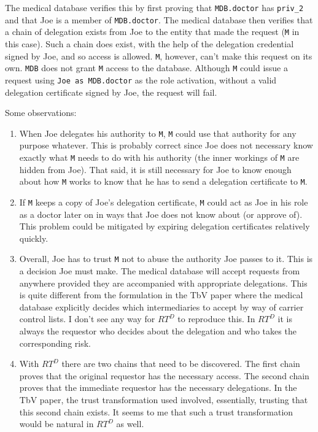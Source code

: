 \documentclass{article}
\begin{document}
The medical database verifies this by first proving that \texttt{MDB.doctor} has
\texttt{priv\_2} and that Joe is a member of \texttt{MDB.doctor}. The medical database then
verifies that a chain of delegation exists from Joe to the entity that made the request
(\texttt{M} in this case). Such a chain does exist, with the help of the delegation credential
signed by Joe, and so access is allowed. \texttt{M}, however, can't make this request on its
own. \texttt{MDB} does not grant \texttt{M} access to the database. Although \texttt{M} could
issue a request using \texttt{Joe as MDB.doctor} as the role activation, without a valid
delegation certificate signed by Joe, the request will fail.

Some observations:

\begin{enumerate}

\item When Joe delegates his authority to \texttt{M}, \texttt{M} could use that authority for
  any purpose whatever. This is probably correct since Joe does not necessary know exactly what
  \texttt{M} needs to do with his authority (the inner workings of \texttt{M} are hidden from
  Joe). That said, it is still necessary for Joe to know enough about how \texttt{M} works to
  know that he has to send a delegation certificate to \texttt{M}.

\item If \texttt{M} keeps a copy of Joe's delegation certificate, \texttt{M} could act as Joe in
  his role as a doctor later on in ways that Joe does not know about (or approve of). This
  problem could be mitigated by expiring delegation certificates relatively quickly.

\item Overall, Joe has to trust \texttt{M} not to abuse the authority Joe passes to it. This is
  a decision Joe must make. The medical database will accept requests from anywhere provided
  they are accompanied with appropriate delegations. This is quite different from the
  formulation in the TbV paper where the medical database explicitly decides which
  intermediaries to accept by way of carrier control lists. I don't see any way for $RT^D$ to
  reproduce this. In $RT^D$ it is always the requestor who decides about the delegation and who
  takes the corresponding risk.

\item With $RT^D$ there are two chains that need to be discovered. The first chain proves that
  the original requestor has the necessary access. The second chain proves that the immediate
  requestor has the necessary delegations. In the TbV paper, the trust transformation used
  involved, essentially, trusting that this second chain exists. It seems to me that such a
  trust transformation would be natural in $RT^D$ as well.

\end{enumerate}
\end{document}

